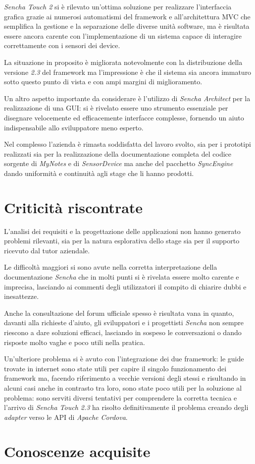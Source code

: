\emph{Sencha Touch 2} si è rilevato un'ottima soluzione per realizzare l'interfaccia grafica grazie ai numerosi automatismi del framework e all'architettura \ac{MVC} che semplifica la gestione e la separazione delle diverse unità software, ma è risultata essere ancora carente con l'implementazione di un sistema capace di interagire correttamente con i sensori dei device.

La situazione in proposito è migliorata notevolmente con la distribuzione della versione \emph{2.3} del framework ma l'impressione è che il sistema sia ancora immaturo sotto questo punto di vista e con ampi margini di miglioramento.

Un altro aspetto importante da considerare è l'utilizzo di \emph{Sencha Architect} per la realizzazione di una \ac{GUI}: si è rivelato essere uno strumento essenziale per disegnare velocemente ed efficacemente interfacce complesse, fornendo un aiuto indispensabile allo sviluppatore meno esperto.

Nel complesso l'azienda è rimasta soddisfatta del lavoro svolto, sia per i prototipi realizzati sia per la realizzazione della documentazione completa del codice sorgente di \emph{MyNotes} e di \emph{SensorDevice} ma anche del pacchetto \emph{SyncEngine} dando uniformità e continuità agli stage che li hanno prodotti.

\section{Criticità riscontrate}
L'analisi dei requisiti e la progettazione delle applicazioni non hanno generato problemi rilevanti, sia per la natura esplorativa dello stage sia per il supporto ricevuto dal tutor aziendale.

Le difficoltà maggiori si sono avute nella corretta interpretazione della documentazione \emph{Sencha} che in molti punti si è rivelata essere molto carente e imprecisa, lasciando ai commenti degli utilizzatori il compito di chiarire dubbi e inesattezze.

Anche la consultazione del forum ufficiale spesso è risultata vana in quanto, davanti alla richieste d'aiuto, gli sviluppatori e i progettisti \emph{Sencha} non sempre riescono a dare soluzioni efficaci, lasciando in sospeso le conversazioni o dando risposte molto vaghe e poco utili nella pratica.

Un'ulteriore problema si è avuto con l'integrazione dei due framework: le guide trovate in internet sono state utili per capire il singolo funzionamento dei framework ma, facendo riferimento a vecchie versioni degli stessi e risultando in alcuni casi anche in contrasto tra loro, sono state poco utili per la soluzione al problema: sono serviti diversi tentativi per comprendere la corretta tecnica e l'arrivo di \emph{Sencha Touch 2.3} ha risolto definitivamente il problema creando degli \emph{adapter} verso le \ac{API} di \emph{Apache Cordova}.

\section{Conoscenze acquisite}